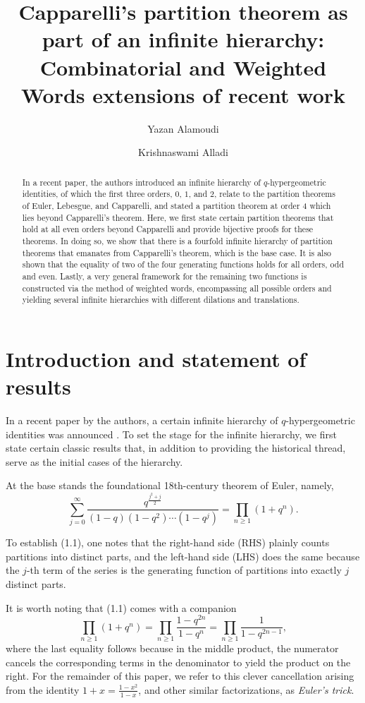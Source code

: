 \documentclass[12pt,a4paper]{amsart}
\title[Capparelli's partition theorem as part of an infinite hierarchy]{Capparelli's partition theorem as part of an infinite hierarchy:\\ Combinatorial and Weighted Words extensions of recent work}
\author{Yazan Alamoudi}
\author{Krishnaswami Alladi}
\theoremstyle{definition}
\theoremstyle{notation}
\theoremstyle{corollary}
\begin{document}
\begin{abstract}
 In a recent paper, the authors introduced an infinite hierarchy of $q$-hypergeometric identities, of which the first three orders, $0$, $1$,  and $2$, relate to the partition theorems of Euler, Lebesgue, and Capparelli, and stated a partition theorem at order 4 which lies beyond Capparelli's theorem. Here, we first state certain partition theorems that hold at all even orders beyond Capparelli and provide bijective proofs for these theorems. In doing so, we show that there is a fourfold infinite hierarchy of partition theorems that emanates from Capparelli's theorem, which is the base case. It is also shown that the equality of two of the four generating functions holds for all orders, odd and even. Lastly, a very general framework for the remaining two functions is constructed via the method of weighted words, encompassing all possible orders and yielding several infinite hierarchies with different dilations and translations.
\end{abstract}


\maketitle

\section{Introduction and statement of results}
In a recent paper by the authors, a certain infinite hierarchy of $q$-hypergeometric identities was announced \cite{YAKA25}. To set the stage for the infinite hierarchy, we first state certain classic results that, in addition to providing the historical thread, serve as the initial cases of the hierarchy. 

At the base stands the foundational 18th-century theorem of Euler, namely,
\[
\sum^{\infty}_{j=0}\frac{q^{\frac{j^2+j}{2}}}{(1-q)(1-q^2)\cdots(1-q^j)}
=\prod_{n\geq1}(1+q^{n}).\tag{1.1}
\]

To establish (1.1), one notes that the right-hand side (RHS) plainly counts partitions into distinct parts, and the left-hand side (LHS) does the same because the $j$-th term of the series is the generating function of partitions into exactly $j$ distinct parts.



It is worth noting that (1.1) comes with a companion 
\[\prod_{n\geq1}(1+q^{n})=\prod_{n\geq1}\frac{1-q^{2n}}{1-q^n}=\prod_{n\geq1}\frac{1}{1-q^{2n-1}},\tag{1.2}\]
where the last equality follows because in the middle product, the numerator cancels the corresponding terms in the denominator to yield the product on the right. For the remainder of this paper, we refer to this clever cancellation arising
from the identity $1+x=\frac{1-x^2}{1-x}$, and other similar factorizations, as \textit{Euler's trick}.
\end{document}
